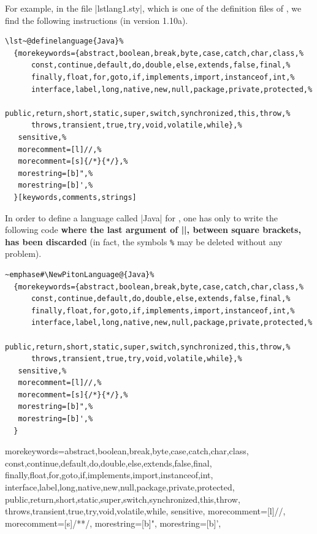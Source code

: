 \documentclass{article}
\begin{document}
\medskip
For example, in the file |lstlang1.sty|, which is one of the definition files
of , we find the following instructions (in version 1.10a).

\begin{small}
\begin{Verbatim}
\lst~@definelanguage{Java}%
  {morekeywords={abstract,boolean,break,byte,case,catch,char,class,%
      const,continue,default,do,double,else,extends,false,final,%
      finally,float,for,goto,if,implements,import,instanceof,int,%
      interface,label,long,native,new,null,package,private,protected,%
      public,return,short,static,super,switch,synchronized,this,throw,%
      throws,transient,true,try,void,volatile,while},%
   sensitive,%
   morecomment=[l]//,%
   morecomment=[s]{/*}{*/},%
   morestring=[b]",%
   morestring=[b]',%
  }[keywords,comments,strings]
\end{Verbatim}
\end{small}

\medskip
In order to define a language called |Java| for , one has only to
write the following code {\bfseries where the last argument of
|\lst@definelanguage|, between square brackets, has been discarded} (in fact,
the symbols \verb+%+ may be deleted without any problem).

\begin{small}
\begin{Verbatim}
~emphase#\NewPitonLanguage@{Java}%
  {morekeywords={abstract,boolean,break,byte,case,catch,char,class,%
      const,continue,default,do,double,else,extends,false,final,%
      finally,float,for,goto,if,implements,import,instanceof,int,%
      interface,label,long,native,new,null,package,private,protected,%
      public,return,short,static,super,switch,synchronized,this,throw,%
      throws,transient,true,try,void,volatile,while},%
   sensitive,%
   morecomment=[l]//,%
   morecomment=[s]{/*}{*/},%
   morestring=[b]",%
   morestring=[b]',%
  }
\end{Verbatim}
\end{small}


  {morekeywords={abstract,boolean,break,byte,case,catch,char,class,
      const,continue,default,do,double,else,extends,false,final,
      finally,float,for,goto,if,implements,import,instanceof,int,
      interface,label,long,native,new,null,package,private,protected,
      public,return,short,static,super,switch,synchronized,this,throw,
      throws,transient,true,try,void,volatile,while},
   sensitive,
   morecomment=[l]//,
   morecomment=[s]{/*}{*/},
   morestring=[b]",
   morestring=[b]',
  }
\end{document}
